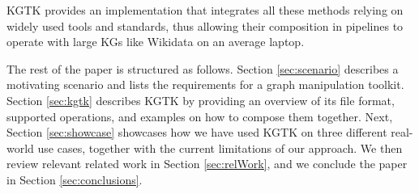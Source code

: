 \documentclass[runningheads]{llncs}
\newcommand{\kibitz}[2]{%
{\color{#1}#2}{}%
}
\newcommand{\pedro}[1]{\kibitz{orange}{[PS: #1]}} %
\newcommand{\DS}[1]{\kibitz{blue}{[DS: #1]}} %
\begin{document}
KGTK provides an implementation that integrates all these methods relying on widely used tools and standards, thus allowing their composition in pipelines to operate with large KGs like Wikidata on an average laptop. 

The rest of the paper is structured as follows. Section \ref{sec:scenario} describes a motivating scenario and lists the requirements for a graph manipulation toolkit. Section \ref{sec:kgtk} describes KGTK by providing an overview of its file format, supported operations, and examples on how to compose them together. Next, Section \ref{sec:showcase} showcases how we have used KGTK on three different real-world use cases, together with the current limitations of our approach. We then review relevant related work in Section \ref{sec:relWork}, and we conclude the paper in Section \ref{sec:conclusions}.










\end{document}
